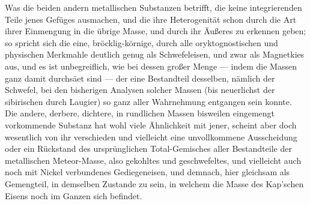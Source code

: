 \documentclass[a4paper, 11pt, oneside, german]{article}
\begin{document}
{Was die beiden andern metallischen Substanzen betrifft, die keine integrierenden Teile jenes Gefüges ausmachen, und die ihre Heterogenität schon durch die Art ihrer Einmengung in die übrige Masse, und durch ihr Äußeres zu erkennen geben; so spricht sich die eine, bröcklig-körnige, durch alle oryktognostischen und physischen Merkmahle deutlich genug als Schwefeleisen, und zwar als Magnetkies aus, und es ist unbegreiflich, wie bei dessen großer Menge --- indem die Massen ganz damit durchsäet sind --- der eine Bestandteil desselben, nämlich der Schwefel, bei den bisherigen Analysen solcher Massen (bis neuerlichst der sibirischen durch Laugier) so ganz aller Wahrnehmung entgangen sein konnte.\\
Die andere, derbere, dichtere, in rundlichen Massen bisweilen eingemengt vorkommende Substanz hat wohl viele Ähnlichkeit mit jener, scheint aber doch wesentlich von ihr verschieden und vielleicht eine unvollkommene Ausscheidung oder ein Rückstand des ursprünglichen Total-Gemisches aller Bestandteile der metallischen Meteor-Masse, also gekohltes und geschwefeltes, und vielleicht auch noch mit Nickel verbundenes Gediegeneisen, und demnach, hier gleichsam als Gemengteil, in demselben Zustande zu sein, in welchem die Masse des Kap’schen Eisens noch im Ganzen sich befindet.\\
}
\end{document}
